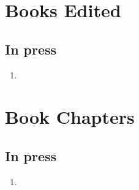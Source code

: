 \section*{Books Edited}


\subsection*{In press}

\begin{enumerate}
    \item {}
\end{enumerate}

\section*{Book Chapters}


\subsection*{In press}

\begin{enumerate}
    \item {}
\end{enumerate}


